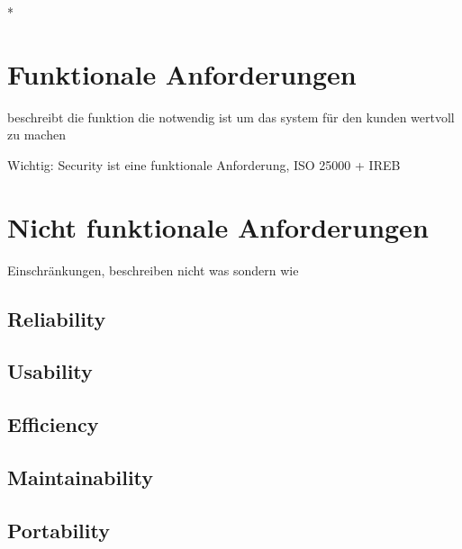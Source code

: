 *

\section{Funktionale Anforderungen}
beschreibt die funktion die notwendig ist um das system für den kunden wertvoll zu machen\cite[S. 79]{reqanalysis}


Wichtig: Security ist eine funktionale Anforderung, ISO 25000 + IREB

\section{Nicht funktionale Anforderungen}
Einschränkungen, beschreiben nicht was sondern wie\cite[S. 80]{reqanalysis}

\subsection{Reliability}
\subsection{Usability}
\subsection{Efficiency}
\subsection{Maintainability}
\subsection{Portability}